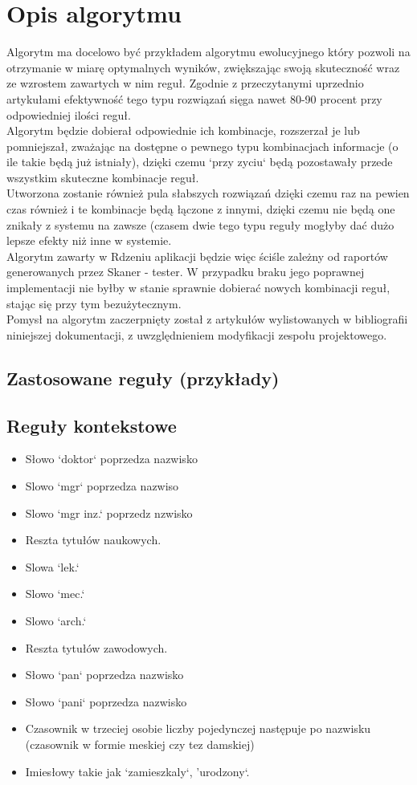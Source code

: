 \documentclass[12pt]{article}
\begin{document}
\section{Opis algorytmu}
Algorytm ma docelowo być przykładem algorytmu ewolucyjnego który pozwoli na otrzymanie w miarę optymalnych wyników, zwiększając swoją skuteczność wraz ze wzrostem zawartych w nim reguł.
Zgodnie z przeczytanymi uprzednio artykułami efektywność tego typu rozwiązań sięga nawet 80-90 procent przy odpowiedniej ilości reguł. 
\\Algorytm będzie dobierał odpowiednie ich kombinacje, rozszerzał je lub pomniejszał, zważając na dostępne o pewnego typu kombinacjach informacje (o ile takie będą już istniały), dzięki czemu `przy zyciu` będą pozostawały przede wszystkim skuteczne kombinacje reguł. 
\\Utworzona zostanie również pula słabszych rozwiązań dzięki czemu raz na pewien czas również i te kombinacje będą łączone z innymi, dzięki czemu nie będą one znikały z systemu na zawsze (czasem dwie tego typu reguły mogłyby dać dużo lepsze efekty niż inne w systemie.
\\Algorytm zawarty w Rdzeniu aplikacji będzie więc ściśle zależny od raportów generowanych przez Skaner - tester. W przypadku braku jego poprawnej implementacji nie byłby w stanie sprawnie dobierać nowych kombinacji reguł, stając się przy tym bezużytecznym.
\\Pomysł na algorytm zaczerpnięty został z artykułów wylistowanych w bibliografii niniejszej dokumentacji, z uwzględnieniem modyfikacji zespołu projektowego.
\subsection{Zastosowane reguły (przykłady)}
\subsection {Reguły kontekstowe}
\begin{itemize}
\item Słowo `doktor` poprzedza nazwisko
\item Slowo `mgr` poprzedza nazwiso
\item Slowo `mgr inz.` poprzedz nzwisko
\item Reszta tytułów naukowych.
\item Slowa `lek.`
\item Slowo `mec.`
\item Slowo `arch.`
\item Reszta tytułów zawodowych.
\item Słowo `pan` poprzedza nazwisko
\item Słowo `pani` poprzedza nazwisko
\item Czasownik w trzeciej osobie liczby pojedynczej następuje po nazwisku (czasownik w formie meskiej czy tez damskiej)
\item Imiesłowy takie jak `zamieszkaly`, 'urodzony`.
\end{itemize}
\end{document}
